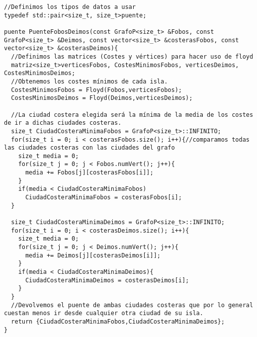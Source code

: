 \begin{verbatim}
//Definimos los tipos de datos a usar
typedef std::pair<size_t, size_t>puente;

puente PuenteFobosDeimos(const GrafoP<size_t> &Fobos, const GrafoP<size_t> &Deimos, const vector<size_t> &costerasFobos, const vector<size_t> &costerasDeimos){
  //Definimos las matrices (Costes y vértices) para hacer uso de floyd
  matriz<size_t>verticesFobos, CostesMinimosFobos, verticesDeimos, CostesMinimosDeimos;
  //Obtenemos los costes mínimos de cada isla.
  CostesMinimosFobos = Floyd(Fobos,verticesFobos);
  CostesMinimosDeimos = Floyd(Deimos,verticesDeimos);

  //La ciudad costera elegida será la mínima de la media de los costes de ir a dichas ciudades costeras.
  size_t CiudadCosteraMinimaFobos = GrafoP<size_t>::INFINITO;
  for(size_t i = 0; i < costerasFobos.size(); i++){//comparamos todas las ciudades costeras con las ciudades del grafo
    size_t media = 0;
    for(size_t j = 0; j < Fobos.numVert(); j++){
      media += Fobos[j][costerasFobos[i]];
    }
    if(media < CiudadCosteraMinimaFobos)
      CiudadCosteraMinimaFobos = costerasFobos[i];
  }

  size_t CiudadCosteraMinimaDeimos = GrafoP<size_t>::INFINITO;
  for(size_t i = 0; i < costerasDeimos.size(); i++){
    size_t media = 0;
    for(size_t j = 0; j < Deimos.numVert(); j++){
      media += Deimos[j][costerasDeimos[i]];
    }
    if(media < CiudadCosteraMinimaDeimos){
      CiudadCosteraMinimaDeimos = costerasDeimos[i];
    }
  }
  //Devolvemos el puente de ambas ciudades costeras que por lo general cuestan menos ir desde cualquier otra ciudad de su isla.
  return {CiudadCosteraMinimaFobos,CiudadCosteraMinimaDeimos};
}
\end{verbatim}

